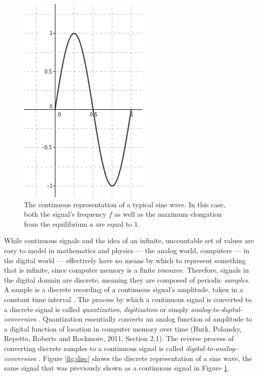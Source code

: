 \documentclass[12pt,twoside]{report}
\begin{document}
\begin{figure}[h!]

  \centering

  \includegraphics[scale=0.5]{img/cont}

  \caption{The continuous representation of a typical sine wave. In this case, both the signal's frequency $f$ as well as the maximum elongation from the equilibrium $a$ are equal to $1$. }

  \label{fig:cont}

\end{figure}

\pagebreak

\noindent While continuous signals and the idea of an infinite, uncountable set of values are easy to model in mathematics and physics --- the analog world, computers --- in the digital world --- effectively have no means by which to represent something that is infinite, since computer memory is a finite resource. Therefore, signals in the digital domain are discrete, meaning they are composed of periodic \emph{samples}. A sample is a discrete recording of a continuous signal's amplitude, taken in a constant time interval . The process by which a continuous signal is converted to a discrete signal is called \emph{quantization}, \emph{digitization} or simply \emph{analog-to-digital-conversion}  . Quantization essentially converts an analog function of amplitude to a digital function of location in computer memory over time (Burk, Polansky, Repetto, Roberts and Rockmore, 2011, Section 2.1). The reverse process of converting discrete samples to a continuous signal is called \emph{digital-to-analog-conversion} . Figure \ref{fig:disc} shows the discrete representation of a sine wave, the same signal that was previously shown as a continuous signal in Figure \ref{fig:cont}.
\end{document}
